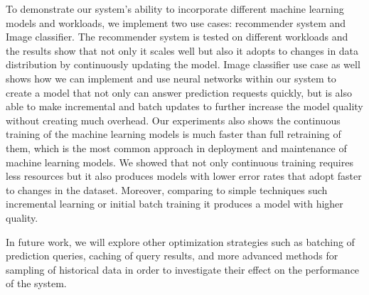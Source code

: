 \documentclass{sig-alternate-05-2015}
\begin{document}
To demonstrate our system's ability to incorporate different machine learning models and workloads, we implement two use cases: recommender system and Image classifier.
The recommender system is tested on different workloads and the results show that not only it scales well but also it adopts to changes in data distribution by continuously updating the model.
Image classifier use case as well shows how we can implement and use neural networks within our system to create a model that not only can answer prediction requests quickly, but is also able to make incremental and batch updates to further increase the model quality without creating much overhead.
Our experiments also shows the continuous training of the machine learning models is much faster than full retraining of them, which is the most common approach in deployment and maintenance of machine learning models. We showed that not only continuous training requires less resources but it also produces models with lower error rates that adopt faster to changes in the dataset.
Moreover, comparing to simple techniques such incremental learning or initial batch training it produces a model with higher quality.

In future work, we will explore other optimization strategies such as batching of prediction queries, caching of query results, and more advanced methods for sampling of historical data in order to investigate their effect on the performance of the system.


\end{document}
